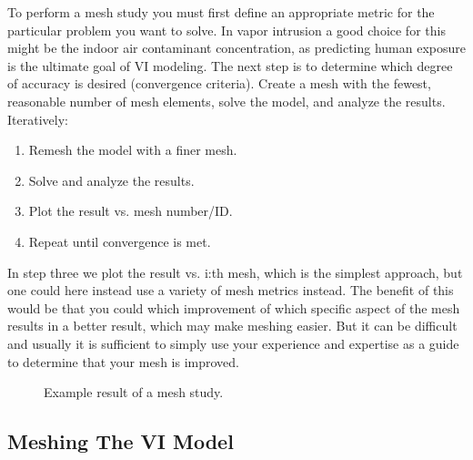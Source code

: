 To perform a mesh study you must first define an appropriate metric for the particular problem you want to solve.
In vapor intrusion a good choice for this might be the indoor air contaminant concentration, as predicting human exposure is the ultimate goal of VI modeling.
The next step is to determine which degree of accuracy is desired (convergence criteria).
Create a mesh with the fewest, reasonable number of mesh elements, solve the model, and analyze the results.
Iteratively:
\begin{enumerate}
  \item Remesh the model with a finer mesh.
  \item Solve and analyze the results.
  \item Plot the result vs. mesh number/ID.
  \item Repeat until convergence is met.
\end{enumerate}
In step three we plot the result vs. i:th mesh, which is the simplest approach, but one could here instead use a variety of mesh metrics instead.
The benefit of this would be that you could which improvement of which specific aspect of the mesh results in a better result, which may make meshing easier.
But it can be difficult and usually it is sufficient to simply use your experience and expertise as a guide to determine that your mesh is improved.\par

\begin{figure}[htb!]
  \caption{Example result of a mesh study.}
  \label{fig:mesh_study}
\end{figure}

\subsection{Meshing The VI Model}
